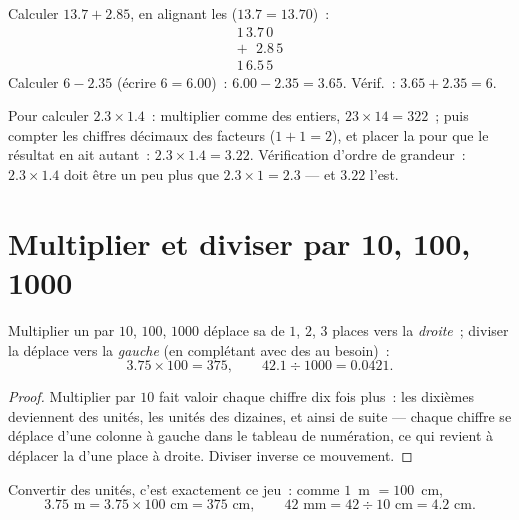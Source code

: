 \begin{example}\label{ex:g6:decimals:addsub}
Calculer $13.7 + 2.85$, en alignant les  ($13.7 = 13.70$)~:
\[
\begin{array}{r}
1\,3.7\,0 \\
+\ \ \,2.8\,5 \\
\hline
1\,6.5\,5
\end{array}
\]
Calculer $6 - 2.35$ (écrire $6 = 6.00$)~:
$6.00 - 2.35 = 3.65$. Vérif.~: $3.65 + 2.35 = 6$.
\end{example}

\begin{example}\label{ex:g6:decimals:mult}
Pour calculer $2.3 \times 1.4$~: multiplier comme des entiers,
$23 \times 14 = 322$~; puis compter les chiffres décimaux des
facteurs ($1 + 1 = 2$), et placer la  pour que le résultat en
ait autant~: $2.3 \times 1.4 = 3.22$. Vérification d'ordre de
grandeur~: $2.3 \times 1.4$ doit être un peu plus que
$2.3 \times 1 = 2.3$ --- et $3.22$ l'est.
\end{example}

\section{Multiplier et diviser par 10, 100, 1000}

\begin{proposition}\label{prop:g6:decimals:shift}
Multiplier un  par $10$, $100$, $1000$ déplace sa
 de $1$, $2$, $3$ places vers la \emph{droite}~; diviser la
déplace vers la \emph{gauche} (en complétant avec des  au
besoin)~:
\[
3.75 \times 100 = 375, \qquad
42.1 \div 1000 = 0.0421 .
\]
\end{proposition}

\begin{proof}
Multiplier par $10$ fait valoir chaque chiffre dix fois plus~: les
dixièmes deviennent des unités, les unités des dizaines, et ainsi de
suite --- chaque chiffre se déplace d'une colonne à gauche dans le
tableau de numération, ce qui revient à déplacer la  d'une
place à droite. Diviser inverse ce mouvement.
\end{proof}

\begin{example}\label{ex:g6:decimals:units}
Convertir des unités, c'est exactement ce jeu~: comme $1$~m $= 100$~cm,
\[
3.75 \text{ m} = 3.75 \times 100 \text{ cm} = 375 \text{ cm},
\qquad
42 \text{ mm} = 42 \div 10 \text{ cm} = 4.2 \text{ cm}.
\]
\end{example}

